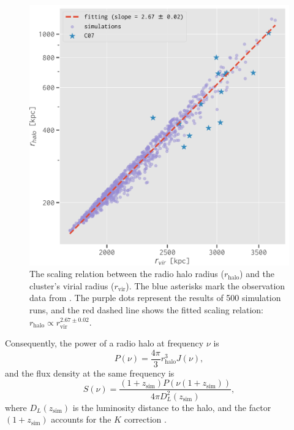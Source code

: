 \documentclass[twocolumn]{aastex62}
\newcommand{\R}[1]{\mathrm{#1}}
\newcommand{\editone}[1]{{\leavevmode\color{cyan}#1}}
\begin{document}
\begin{figure}
  \centering
  \includegraphics[width=\columnwidth]{halo-radius-rvir}
  \caption{\label{fig:halo-radius}\editone{%
    The scaling relation between the radio halo radius ($r_{\R{halo}}$) and
    the cluster's virial radius ($r_{\R{vir}}$).
    The blue asterisks mark the observation data from \citet{cassano2007}.
    The purple dots represent the results of 500 simulation runs, and the red
    dashed line shows the fitted scaling relation:
    $r_{\R{halo}} \propto r_{\R{vir}}^{2.67 \pm 0.02}$.
  }}
\end{figure}

Consequently, the power of a radio halo at frequency $\nu$ is
\begin{equation}
  \label{eq:halo-power}
  P(\nu) = \frac{4\pi}{3} r_{\R{halo}}^3 J(\nu),
\end{equation}
and the flux density at the same frequency is
\begin{equation}
  \label{eq:halo-flux}
  S(\nu) = \frac{(1+z_{\R{sim}}) P(\nu(1+z_{\R{sim}}))}
    {4\pi D_{\!L}^2(z_{\R{sim}})} ,
\end{equation}
where $D_{\!L}(z_{\R{sim}})$ is the luminosity distance to the halo,
and the factor $(1 + z_{\R{sim}})$ accounts for the $K$ correction
\citep[e.g.,][]{hogg1999}.


\end{document}
